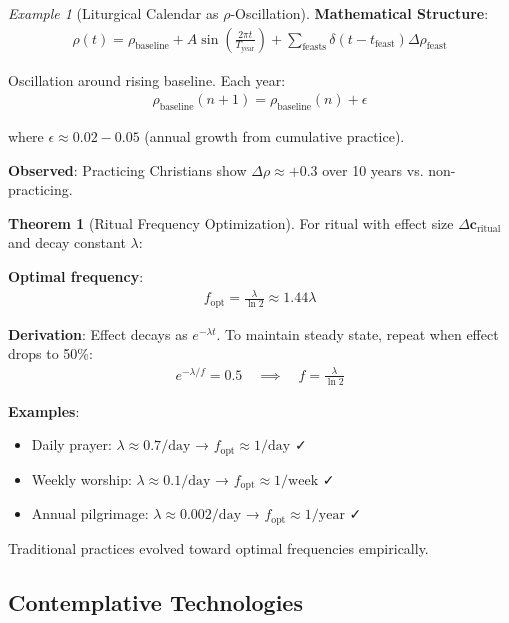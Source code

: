 \documentclass[11pt,a4paper]{article}
\theoremstyle{definition}
\newtheorem{theorem}{Theorem}[section]
\theoremstyle{remark}
\newtheorem{example}{Example}[section]
\newcommand{\cc}{\mathbf{c}}
\begin{document}
\begin{small}
\begin{enumerate}
\begin{protocol}
\begin{example}[Liturgical Calendar as \(\rho\)-Oscillation]
\textbf{Mathematical Structure}:
\begin{align}
\rho(t) = \rho_{\text{baseline}} + A\sin\left(\frac{2\pi t}{T_{\text{year}}}\right) + \sum_{\text{feasts}} \delta(t - t_{\text{feast}})\Delta\rho_{\text{feast}}
\end{align}

Oscillation around rising baseline. Each year:
\begin{align}
\rho_{\text{baseline}}(n+1) = \rho_{\text{baseline}}(n) + \epsilon
\end{align}

where \(\epsilon \approx 0.02-0.05\) (annual growth from cumulative practice).

\textbf{Observed}: Practicing Christians show \(\Delta\rho \approx +0.3\) over 10 years vs. non-practicing.
\end{example}

\begin{theorem}[Ritual Frequency Optimization]
For ritual with effect size \(\Delta\cc_{\text{ritual}}\) and decay constant \(\lambda\):

\textbf{Optimal frequency}:
\begin{align}
f_{\text{opt}} = \frac{\lambda}{\ln 2} \approx 1.44\lambda
\end{align}

\textbf{Derivation}: Effect decays as \(e^{-\lambda t}\). To maintain steady state, repeat when effect drops to 50\%:
\begin{align}
e^{-\lambda/f} = 0.5 \quad \implies \quad f = \frac{\lambda}{\ln 2}
\end{align}

\textbf{Examples}:
\begin{itemize}
    \item Daily prayer: \(\lambda \approx 0.7/\text{day}\) → \(f_{\text{opt}} \approx 1/\text{day}\) ✓
    \item Weekly worship: \(\lambda \approx 0.1/\text{day}\) → \(f_{\text{opt}} \approx 1/\text{week}\) ✓
    \item Annual pilgrimage: \(\lambda \approx 0.002/\text{day}\) → \(f_{\text{opt}} \approx 1/\text{year}\) ✓
\end{itemize}

Traditional practices evolved toward optimal frequencies empirically.
\end{theorem}

\subsection{Contemplative Technologies}


\end{protocol}
\end{enumerate}
\end{small}
\end{document}
